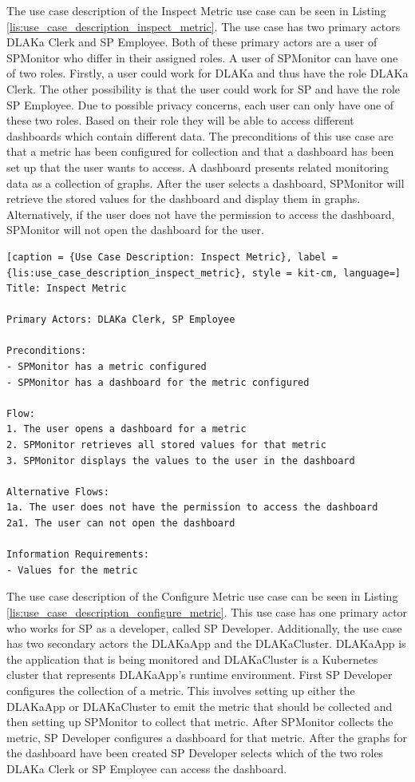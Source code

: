 The use case description of the Inspect Metric use case can be seen in Listing \ref{lis:use_case_description_inspect_metric}.
The use case has two primary actors DLAKa Clerk and SP Employee.
Both of these primary actors are a user of SPMonitor who differ in their assigned roles.
A user of SPMonitor can have one of two roles. Firstly, a user could work for DLAKa and thus have the role
DLAKa Clerk. The other possibility is that the user could work for SP and have the role SP Employee.
Due to possible privacy concerns, each user can only have one of these two roles.
Based on their role they will be able to access different dashboards which contain different data.
The preconditions of this use case are that a metric has been configured for collection and that a dashboard
has been set up that the user wants to access. A dashboard presents related monitoring data as a collection of graphs.
After the user selects a dashboard, SPMonitor will retrieve the stored values for the dashboard and display
them in graphs. Alternatively, if the user does not have the permission to access the dashboard,
SPMonitor will not open the dashboard for the user.

\begin{lstlisting}[caption = {Use Case Description: Inspect Metric}, label = {lis:use_case_description_inspect_metric}, style = kit-cm, language=]
Title: Inspect Metric

Primary Actors: DLAKa Clerk, SP Employee

Preconditions:
- SPMonitor has a metric configured
- SPMonitor has a dashboard for the metric configured

Flow:
1. The user opens a dashboard for a metric
2. SPMonitor retrieves all stored values for that metric
3. SPMonitor displays the values to the user in the dashboard

Alternative Flows:
1a. The user does not have the permission to access the dashboard
2a1. The user can not open the dashboard

Information Requirements:
- Values for the metric
\end{lstlisting}

The use case description of the Configure Metric use case can be seen in Listing \ref{lis:use_case_description_configure_metric}.
This use case has one primary actor who works for SP as a developer, called SP Developer.
Additionally, the use case has two secondary actors the DLAKaApp and the DLAKaCluster.
DLAKaApp is the application that is being monitored and DLAKaCluster is a Kubernetes
cluster that represents DLAKaApp's runtime environment.
First SP Developer configures the collection of a metric. This involves setting up
either the DLAKaApp or DLAKaCluster to emit the metric that should be collected
and then setting up SPMonitor to collect that metric. After SPMonitor collects the metric,
SP Developer configures a dashboard for that metric. After the graphs for the dashboard
have been created SP Developer selects which of the two roles DLAKa Clerk or SP Employee
can access the dashboard.

